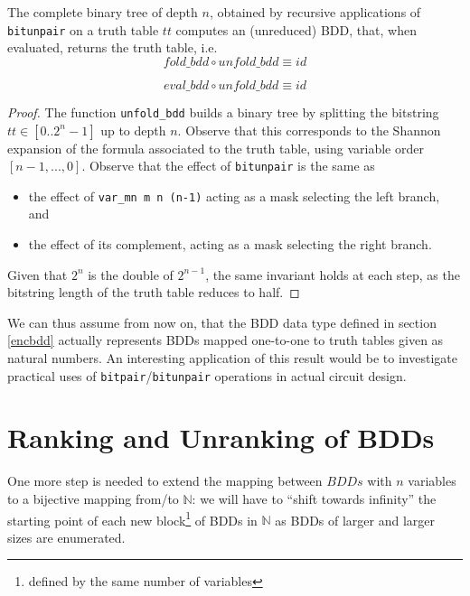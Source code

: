 \documentclass[]{INCLUDES/llncs}
\begin{document}
\begin{prop} \label{tt}
The complete binary tree of depth $n$, obtained by recursive 
applications of {\tt bitunpair} on a truth table $tt$
computes an (unreduced) BDD, that, when evaluated, 
returns the truth table, i.e.
\begin{equation}
fold\_bdd \circ unfold\_bdd \equiv id
\end{equation}

\begin{equation}
eval\_bdd \circ unfold\_bdd \equiv id
\end{equation}
\end{prop}
\begin{proof} The function {\tt unfold\_bdd} builds a
binary tree by splitting the bitstring $tt \in [0..2^n-1]$ up to depth $n$. 
Observe that this corresponds to the Shannon expansion \cite{shannon_all} of the
formula associated to the truth table, using variable order $[n-1,...,0]$.
Observe that the effect of {\tt bitunpair} is the same as
\begin{itemize}
  \item the effect of {\tt var\_mn m n (n-1)} 
     acting as a mask selecting the left branch, and
\item 
     the effect of its complement, acting as a mask selecting the right
     branch.
\end{itemize}
Given that $2^n$ is the double of $2^{n-1}$, the same invariant holds at each
step, as the bitstring length of the truth table reduces to half. 
\end{proof}
We can thus assume from now on, that the BDD data type defined in
section \ref{encbdd} actually represents BDDs mapped one-to-one to truth tables
given as natural numbers.
An interesting application of this result would
be to investigate practical uses of 
{\tt bitpair}/{\tt bitunpair} operations in actual circuit design.

\section{Ranking and Unranking of BDDs} \label{rank}

One more step is needed to extend the mapping between $BDDs$ with $n$
variables to a bijective mapping from/to $\mathbb{N}$: 
we will have to ``shift towards infinity'' 
the starting point of each new block\footnote{defined by the same number of
variables} of BDDs in $\mathbb{N}$ as BDDs of larger and larger sizes are enumerated.
\end{document}
